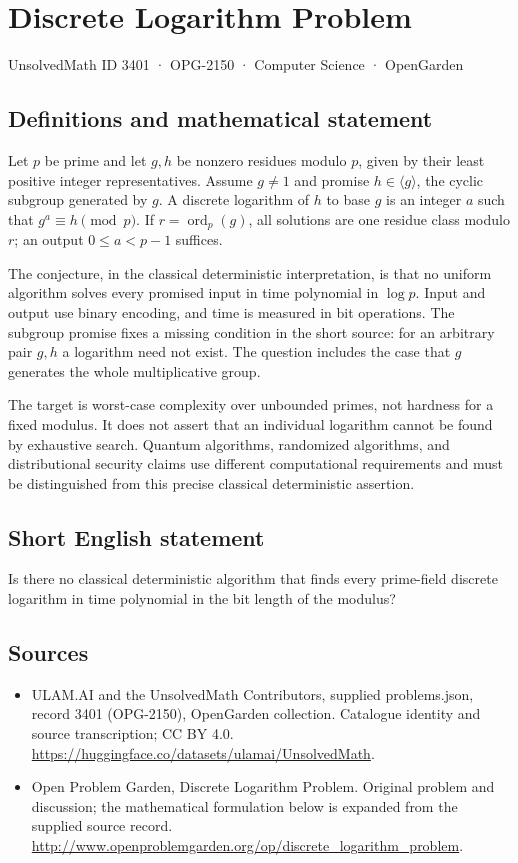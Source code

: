 \documentclass[11pt,a4paper]{article}
\begin{document}
\section*{Discrete Logarithm Problem}\label{3401}
{\small UnsolvedMath ID 3401 · OPG-2150 · Computer Science · OpenGarden}
\subsection{Definitions and mathematical statement}
Let $p$ be prime and let $g,h$ be nonzero residues modulo $p$, given
by their least positive integer representatives. Assume $g\ne1$
and promise $h\in\langle g\rangle$, the cyclic subgroup generated
by $g$. A discrete logarithm of $h$ to base $g$ is an integer $a$
such that $g^a\equiv h\pmod p$. If $r=\operatorname{ord}_p(g)$,
all solutions are one residue class modulo $r$; an output
$0\le a<p-1$ suffices.

The conjecture, in the classical deterministic interpretation, is
that no uniform algorithm solves every promised input in time
polynomial in $\log p$. Input and output use binary encoding, and
time is measured in bit operations. The subgroup promise fixes a
missing condition in the short source: for an arbitrary pair $g,h$
a logarithm need not exist. The question includes the case that $g$
generates the whole multiplicative group.

The target is worst-case complexity over unbounded primes, not
hardness for a fixed modulus. It does not assert that an individual
logarithm cannot be found by exhaustive search. Quantum algorithms,
randomized algorithms, and distributional security claims use
different computational requirements and must be distinguished from
this precise classical deterministic assertion.
\subsection{Short English statement}
Is there no classical deterministic algorithm that finds every prime-field discrete logarithm in time polynomial in the bit length of the modulus?
\subsection{Sources}
\begin{itemize}
\item[S1] ULAM.AI and the UnsolvedMath Contributors, supplied problems.json, record 3401 (OPG-2150), OpenGarden collection. Catalogue identity and source transcription; CC BY 4.0.
\url{https://huggingface.co/datasets/ulamai/UnsolvedMath}.
\item[S2] Open Problem Garden, Discrete Logarithm Problem. Original problem and discussion; the mathematical formulation below is expanded from the supplied source record.
\url{http://www.openproblemgarden.org/op/discrete_logarithm_problem}.
\end{itemize}
\end{document}
